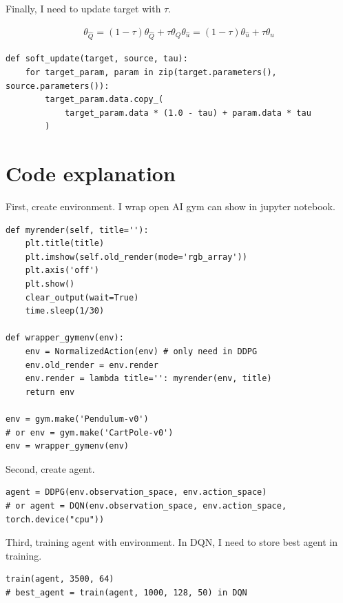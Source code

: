 \documentclass[12pt]{article}
\begin{document}
Finally, I need to update target with $\tau$.

\begin{align}
    \theta_{\hat{Q}} = (1 - \tau) \theta_{\hat{Q}} + \tau \theta_Q
    \theta_{\hat{u}} = (1 - \tau) \theta_{\hat{u}} + \tau \theta_u
\end{align}

\begin{verbatim}
def soft_update(target, source, tau):
    for target_param, param in zip(target.parameters(), source.parameters()):
        target_param.data.copy_(
            target_param.data * (1.0 - tau) + param.data * tau
        )
\end{verbatim}

\section{Code explanation}

First, create environment. I wrap open AI gym can show in jupyter notebook.

\begin{verbatim}
def myrender(self, title=''):
    plt.title(title)
    plt.imshow(self.old_render(mode='rgb_array'))
    plt.axis('off')
    plt.show()
    clear_output(wait=True)
    time.sleep(1/30)
    
def wrapper_gymenv(env):
    env = NormalizedAction(env) # only need in DDPG
    env.old_render = env.render
    env.render = lambda title='': myrender(env, title)
    return env

env = gym.make('Pendulum-v0') 
# or env = gym.make('CartPole-v0')
env = wrapper_gymenv(env)
\end{verbatim}

Second, create agent.

\begin{verbatim}
agent = DDPG(env.observation_space, env.action_space) 
# or agent = DQN(env.observation_space, env.action_space, torch.device("cpu"))

\end{verbatim}

Third, training agent with environment. In DQN, I need to store best agent in training.

\begin{verbatim}
train(agent, 3500, 64) 
# best_agent = train(agent, 1000, 128, 50) in DQN
\end{verbatim}
\end{document}
